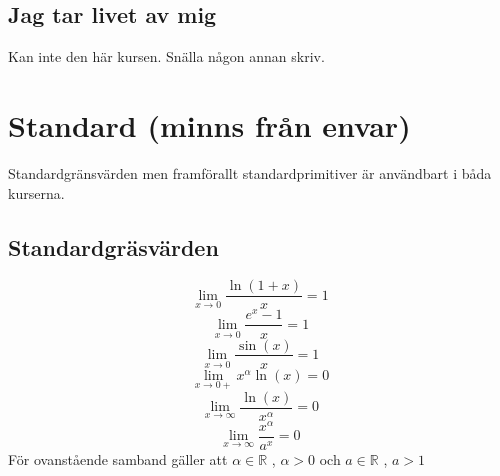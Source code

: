 \documentclass[10pt,a4paper]{article}
\begin{document}
\subsection{Jag tar livet av mig}
Kan inte den här kursen. Snälla någon annan skriv.

\section{Standard (minns från envar)}
Standardgränsvärden men framförallt standardprimitiver är användbart i båda kurserna.

\subsection{Standardgräsvärden}
\begin{equation}
\lim_{x\to 0} \frac{\ln(1+x)}{x}=1
\end{equation}
\begin{equation}
\lim_{x\to 0} \frac{e^x-1}{x}=1
\end{equation}
\begin{equation}
\lim_{x\to 0} \frac{\sin(x)}{x}=1
\end{equation}
\begin{equation}
\lim_{x\to 0+} x^\alpha \ln(x)=0
\end{equation}
\begin{equation}
\lim_{x\to \infty} \frac{\ln(x)}{x^\alpha}=0
\end{equation}
\begin{equation}
\lim_{x\to \infty} \frac{x^\alpha}{a^x}=0
\end{equation}
För ovanstående samband gäller att $\alpha \in \mathbb{R}$ , $\alpha >0$ och $a \in \mathbb{R}$ , $a > 1$
\end{document}
